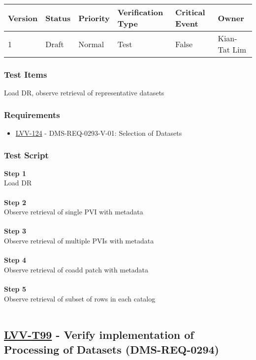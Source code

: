 \begin{longtable}[]{@{}llllll@{}}
\toprule
Version & Status & Priority & Verification Type & Critical Event &
Owner\tabularnewline
\midrule
\endhead
1 & Draft & Normal & Test & False & Kian-Tat Lim\tabularnewline
\bottomrule
\end{longtable}

\hypertarget{test-items-74}{%
\subsubsection{Test Items}\label{test-items-74}}

Load DR, observe retrieval of representative datasets

\hypertarget{requirements-75}{%
\subsubsection{Requirements}\label{requirements-75}}

\begin{itemize}
\tightlist
\item
  \href{https://jira.lsstcorp.org/browse/LVV-124}{LVV-124} -
  DMS-REQ-0293-V-01: Selection of Datasets
\end{itemize}

\hypertarget{test-script-75}{%
\subsubsection{Test Script}\label{test-script-75}}

\textbf{Step 1}\\
Load DR\\
~\\
\textbf{Step 2}\\
Observe retrieval of single PVI with metadata\\
~\\
\textbf{Step 3}\\
Observe retrieval of multiple PVIs with metadata\\
~\\
\textbf{Step 4}\\
Observe retrieval of coadd patch with metadata\\
~\\
\textbf{Step 5}\\
Observe retrieval of subset of rows in each catalog\\
~\\

\hypertarget{lvv-t99---verify-implementation-of-processing-of-datasets-dms-req-0294}{%
\subsection{\texorpdfstring{\href{https://jira.lsstcorp.org/secure/Tests.jspa\#/testCase/LVV-T99}{LVV-T99}
- Verify implementation of Processing of Datasets
(DMS-REQ-0294)}{LVV-T99 - Verify implementation of Processing of Datasets (DMS-REQ-0294)}}\label{lvv-t99---verify-implementation-of-processing-of-datasets-dms-req-0294}}

